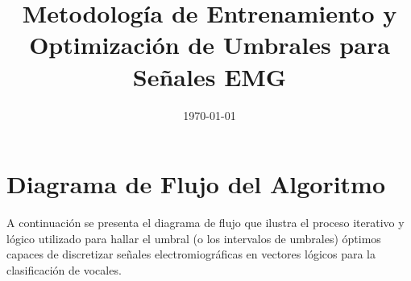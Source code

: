 \documentclass[12pt, a4paper]{article}
\begin{document}
\title{Metodología de Entrenamiento y Optimización de Umbrales para Señales EMG}
\author{}
\date{\today}
\maketitle

\section{Diagrama de Flujo del Algoritmo}

A continuación se presenta el diagrama de flujo que ilustra el proceso iterativo y lógico utilizado para hallar el umbral (o los intervalos de umbrales) óptimos capaces de discretizar señales electromiográficas en vectores lógicos para la clasificación de vocales.
\end{document}
